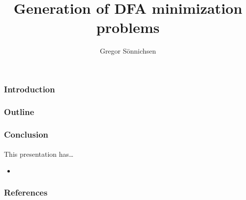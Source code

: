 \documentclass[handout]{beamer}%
\title{Generation of DFA minimization problems}
\author{Gregor Sönnichsen}
\institute{Universität Bayreuth}
\begin{document}
	
	\begin{frame}
		\titlepage
	\end{frame}
	
	
	\begin{frame}
		\frametitle{Introduction}
		
	\end{frame}
	
	\begin{frame}
		\frametitle{Outline}
		\tableofcontents %
	\end{frame}


	\begin{frame}
		\frametitle{Conclusion}
		\framesubtitle{}
		
		This presentation has\ldots
		\begin{itemize}
			\item 
		\end{itemize}
	
	\end{frame}

	\begin{frame}
		\frametitle{References}
		
		\tiny
		
		
	\end{frame}
\end{document}
